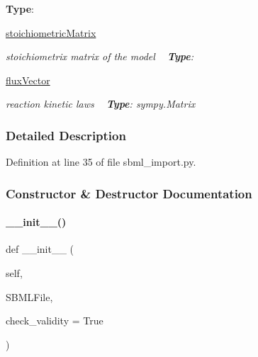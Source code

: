 \begin{DoxyCompactItemize}
\begin{DoxyCompactList}
{\bfseries Type}\+: \end{DoxyCompactList}\item 
\mbox{\label{classamici_1_1sbml__import_1_1_sbml_importer_ad30bd1a098329211e7618dd1065d7067}} 
\mbox{\hyperlink{classamici_1_1sbml__import_1_1_sbml_importer_ad30bd1a098329211e7618dd1065d7067}{stoichiometric\+Matrix}}
\begin{DoxyCompactList}\small\item\em stoichiometrix matrix of the model ~\newline
{\bfseries Type}\+: \end{DoxyCompactList}\item 
\mbox{\label{classamici_1_1sbml__import_1_1_sbml_importer_aa7c12a1cbbde8c960bfaae2ac64f8845}} 
\mbox{\hyperlink{classamici_1_1sbml__import_1_1_sbml_importer_aa7c12a1cbbde8c960bfaae2ac64f8845}{flux\+Vector}}
\begin{DoxyCompactList}\small\item\em reaction kinetic laws ~\newline
{\bfseries Type}\+: sympy.\+Matrix \end{DoxyCompactList}\end{DoxyCompactItemize}


\subsubsection{Detailed Description}


Definition at line 35 of file sbml\+\_\+import.\+py.



\subsubsection{Constructor \& Destructor Documentation}
\mbox{\label{classamici_1_1sbml__import_1_1_sbml_importer_a43883fb7d114020827d890422ebd25b0}} 
\paragraph{\texorpdfstring{\+\_\+\+\_\+init\+\_\+\+\_\+()}{\_\_init\_\_()}}
{\footnotesize\ttfamily def \+\_\+\+\_\+init\+\_\+\+\_\+ (\begin{DoxyParamCaption}\item[{}]{self,  }\item[{}]{S\+B\+M\+L\+File,  }\item[{}]{check\+\_\+validity = {\ttfamily True} }\end{DoxyParamCaption})}


